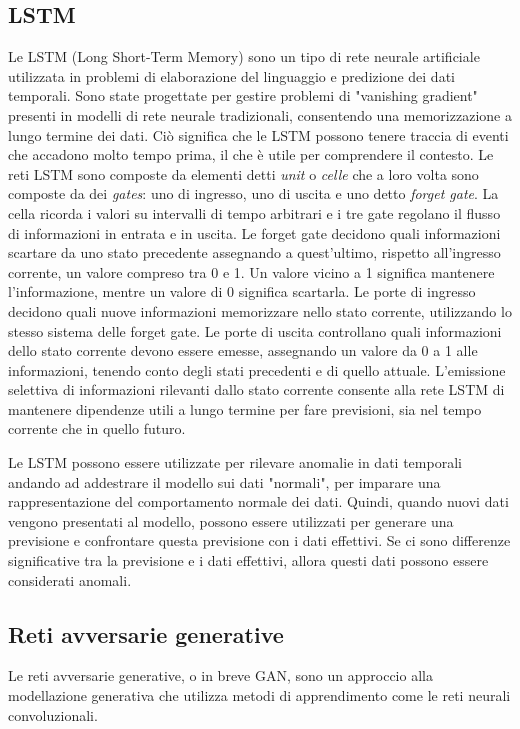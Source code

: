 \subsection{LSTM}
Le LSTM (Long Short-Term Memory) sono un tipo di rete neurale artificiale utilizzata in problemi di elaborazione del linguaggio e predizione dei dati temporali. Sono state progettate per gestire problemi di "vanishing gradient" presenti in modelli di rete neurale tradizionali, consentendo una memorizzazione a lungo termine dei dati. Ciò significa che le LSTM possono tenere traccia di eventi che accadono molto tempo prima, il che è utile per comprendere il contesto.
Le reti LSTM sono composte da elementi detti \textit{unit} o \textit{celle} che a loro volta sono composte da dei \textit{gates}: uno di ingresso, uno di uscita e uno detto \textit{forget gate}. La cella ricorda i valori su intervalli di tempo arbitrari e i tre gate regolano il flusso di informazioni in entrata e in uscita. Le forget gate decidono quali informazioni scartare da uno stato precedente assegnando a quest'ultimo, rispetto all'ingresso corrente, un valore compreso tra 0 e 1. Un valore vicino a 1 significa mantenere l'informazione, mentre un valore di 0 significa scartarla. Le porte di ingresso decidono quali nuove informazioni memorizzare nello stato corrente, utilizzando lo stesso sistema delle forget gate. Le porte di uscita controllano quali informazioni dello stato corrente devono essere emesse, assegnando un valore da 0 a 1 alle informazioni, tenendo conto degli stati precedenti e di quello attuale. L'emissione selettiva di informazioni rilevanti dallo stato corrente consente alla rete LSTM di mantenere dipendenze utili a lungo termine per fare previsioni, sia nel tempo corrente che in quello futuro.

Le LSTM possono essere utilizzate per rilevare anomalie in dati temporali andando ad addestrare il modello sui dati "normali", per imparare una rappresentazione del comportamento normale dei dati. Quindi, quando nuovi dati vengono presentati al modello, possono essere utilizzati per generare una previsione e confrontare questa previsione con i dati effettivi. Se ci sono differenze significative tra la previsione e i dati effettivi, allora questi dati possono essere considerati anomali.


\subsection{Reti avversarie generative}
Le reti avversarie generative, o in breve GAN, sono un approccio alla modellazione generativa che utilizza metodi di apprendimento come le reti neurali convoluzionali.

